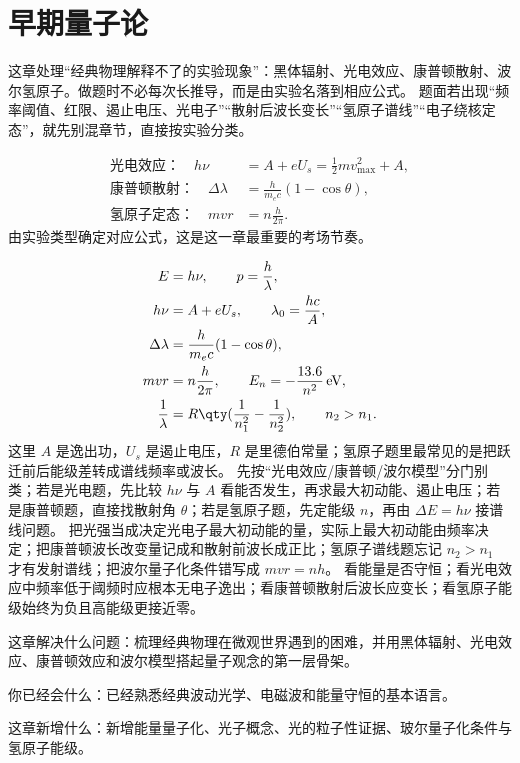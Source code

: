 \documentclass[lang=cn,11pt]{elegantbook}
\newcommand{\chapterroadmap}[3]{%
\begin{introduction}
 \item {\heiti 这章解决什么问题：}#1
 \item {\heiti 你已经会什么：}#2
 \item {\heiti 这章新增什么：}#3
\end{introduction}}
\begin{document}
\chapter{早期量子论}

\begin{skill}[第22章冲刺总手册]\label{sk:phys-ch22-overview}
 这章处理“经典物理解释不了的实验现象”：黑体辐射、光电效应、康普顿散射、波尔氢原子。做题时不必每次长推导，而是由实验名落到相应公式。
 题面若出现“频率阈值、红限、遏止电压、光电子”“散射后波长变长”“氢原子谱线”“电子绕核定态”，就先别混章节，直接按实验分类。

\[
\begin{aligned}
\text{光电效应：}\quad
h\nu&=A+eU_s=\frac12 mv_{\max}^2+A,\\
\text{康普顿散射：}\quad
\Delta\lambda&=\frac{h}{m_ec}(1-\cos\theta),\\
\text{氢原子定态：}\quad
mvr&=n\frac{h}{2\pi}.
\end{aligned}
\]
由实验类型确定对应公式，这是这一章最重要的考场节奏。

\[
\begin{aligned}
E&=h\nu,\qquad
p=\frac{h}{\lambda},\\
h\nu&=A+eU_s,\qquad
\lambda_0=\frac{hc}{A},\\
\Delta\lambda&=\frac{h}{m_ec}(1-\cos\theta),\\
mvr&=n\frac{h}{2\pi},\qquad
E_n=-\frac{13.6}{n^2}\,\mathrm{eV},\\
\frac{1}{\lambda}&=R\qty(\frac{1}{n_1^2}-\frac{1}{n_2^2}),\qquad n_2>n_1.
\end{aligned}
\]
这里 \(A\) 是逸出功，\(U_s\) 是遏止电压，\(R\) 是里德伯常量；氢原子题里最常见的是把跃迁前后能级差转成谱线频率或波长。
 先按“光电效应/康普顿/波尔模型”分门别类；若是光电题，先比较 \(h\nu\) 与 \(A\) 看能否发生，再求最大初动能、遏止电压；若是康普顿题，直接找散射角 \(\theta\)；若是氢原子题，先定能级 \(n\)，再由 \(\Delta E=h\nu\) 接谱线问题。
 把光强当成决定光电子最大初动能的量，实际上最大初动能由频率决定；把康普顿波长改变量记成和散射前波长成正比；氢原子谱线题忘记 \(n_2>n_1\) 才有发射谱线；把波尔量子化条件错写成 \(mvr=nh\)。
 看能量是否守恒；看光电效应中频率低于阈频时应根本无电子逸出；看康普顿散射后波长应变长；看氢原子能级始终为负且高能级更接近零。
\end{skill}

\chapterroadmap
{梳理经典物理在微观世界遇到的困难，并用黑体辐射、光电效应、康普顿效应和波尔模型搭起量子观念的第一层骨架。}
{已经熟悉经典波动光学、电磁波和能量守恒的基本语言。}
{新增能量量子化、光子概念、光的粒子性证据、玻尔量子化条件与氢原子能级。}
\end{document}
